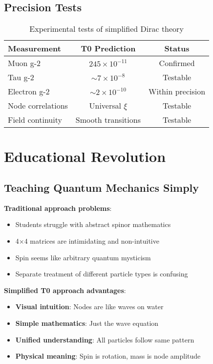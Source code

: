 \documentclass[12pt,a4paper]{article}
\newcommand{\xipar}{\xi}
\theoremstyle{definition}
\theoremstyle{remark}
\begin{document}
	\subsection{Precision Tests}
	
	\begin{table}[htbp]
		\centering
		\begin{tabular}{lcc}
			\toprule
			\textbf{Measurement} & \textbf{T0 Prediction} & \textbf{Status} \\
			\midrule
			Muon g-2 & $245 \times 10^{-11}$ & \checkmark Confirmed \\
			Tau g-2 & $\sim 7 \times 10^{-8}$ & Testable \\
			Electron g-2 & $\sim 2 \times 10^{-10}$ & Within precision \\
			Node correlations & Universal $\xipar$ & Testable \\
			Field continuity & Smooth transitions & Testable \\
			\bottomrule
		\end{tabular}
		\caption{Experimental tests of simplified Dirac theory}
		\label{tab:experimental_tests}
	\end{table}
	
	\section{Educational Revolution}
	
	\subsection{Teaching Quantum Mechanics Simply}
	
	\textbf{Traditional approach problems}:
	\begin{itemize}
		\item Students struggle with abstract spinor mathematics
		\item 4×4 matrices are intimidating and non-intuitive
		\item Spin seems like arbitrary quantum mysticism
		\item Separate treatment of different particle types is confusing
	\end{itemize}
	
	\textbf{Simplified T0 approach advantages}:
	\begin{itemize}
		\item \textbf{Visual intuition}: Nodes are like waves on water
		\item \textbf{Simple mathematics}: Just the wave equation
		\item \textbf{Unified understanding}: All particles follow same pattern
		\item \textbf{Physical meaning}: Spin is rotation, mass is node amplitude
	\end{itemize}
	
\end{document}
